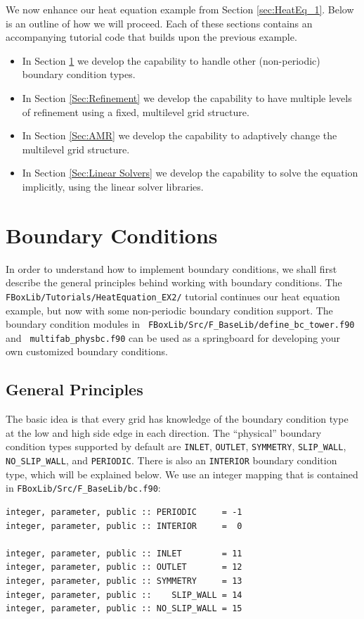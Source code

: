 We now enhance our heat equation example from Section \ref{sec:HeatEq_1}.
Below is an outline of how we will proceed.  Each of these sections contains an 
accompanying tutorial code that builds upon the previous example.
\begin{itemize}

\item In Section \ref{Sec:Boundary Conditions} we develop the
  capability to handle other (non-periodic) boundary condition types.

\item In Section \ref{Sec:Refinement} we develop the capability to
  have multiple levels of refinement using a fixed, multilevel grid
  structure.

\item In Section \ref{Sec:AMR} we develop the capability to adaptively
  change the multilevel grid structure.

\item In Section \ref{Sec:Linear Solvers} we develop the capability to
  solve the equation implicitly, using the linear solver libraries.

\end{itemize}

\section{Boundary Conditions}\label{Sec:Boundary Conditions}
In order to understand how to implement boundary conditions, we shall
first describe the general principles behind working with boundary
conditions.  The {\tt FBoxLib/Tutorials/HeatEquation\_EX2/} tutorial
continues our heat equation example, but now with some non-periodic
boundary condition support.  The boundary condition modules in {\tt
  FBoxLib/Src/F\_BaseLib/define\_bc\_tower.f90} and {\tt
  multifab\_physbc.f90} can be used as a springboard for developing
your own customized boundary conditions.

\subsection{General Principles}
The basic idea is that every grid has knowledge of the
boundary condition type at the low and high side edge in each direction.
The ``physical'' boundary condition types supported by default are {\tt INLET}, {\tt OUTLET},
{\tt SYMMETRY}, {\tt SLIP\_WALL}, {\tt NO\_SLIP\_WALL}, and {\tt PERIODIC}.
There is also an {\tt INTERIOR} boundary condition type, which 
will be explained below.  We use an integer mapping that is 
contained in {\tt FBoxLib/Src/F\_BaseLib/bc.f90}:
\begin{lstlisting}[backgroundcolor=\color{light-green}]
integer, parameter, public :: PERIODIC     = -1
integer, parameter, public :: INTERIOR     =  0

integer, parameter, public :: INLET        = 11
integer, parameter, public :: OUTLET       = 12
integer, parameter, public :: SYMMETRY     = 13
integer, parameter, public ::    SLIP_WALL = 14
integer, parameter, public :: NO_SLIP_WALL = 15
\end{lstlisting}

